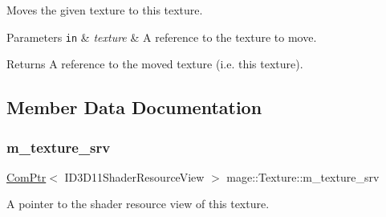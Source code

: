 Moves the given texture to this texture.


\begin{DoxyParams}[1]{Parameters}
\mbox{\tt in}  & {\em texture} & A reference to the texture to move. \\
\hline
\end{DoxyParams}
\begin{DoxyReturn}{Returns}
A reference to the moved texture (i.\+e. this texture). 
\end{DoxyReturn}


\subsection{Member Data Documentation}
\hypertarget{classmage_1_1_texture_a8666bb39618e89e782c7cfeabebcc2b0}{}\label{classmage_1_1_texture_a8666bb39618e89e782c7cfeabebcc2b0} 
\subsubsection{\texorpdfstring{m\+\_\+texture\+\_\+srv}{m\_texture\_srv}}
{\footnotesize\ttfamily \hyperlink{namespacemage_ae74f374780900893caa5555d1031fd79}{Com\+Ptr}$<$ I\+D3\+D11\+Shader\+Resource\+View $>$ mage\+::\+Texture\+::m\+\_\+texture\+\_\+srv\hspace{0.3cm}{\ttfamily [private]}}

A pointer to the shader resource view of this texture. 